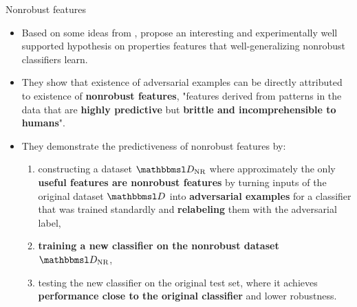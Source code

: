\documentclass{beamer}
\newcommand{\citet}[1]{{\color{citecolor}\relscale{0.8}\textcite{#1}}}
\begin{document}
\begin{frame}[allowframebreaks=0.9]{Nonrobust features}
	\begin{itemize}
		\item Based on some ideas from \citet{Tsipras:2018:RMBOA},  \citet{Ilyas:2019:AENBTF} propose an interesting and experimentally well supported hypothesis on properties features that well-generalizing nonrobust classifiers learn. \item They show that existence of adversarial examples can be directly attributed to existence of \textbf{nonrobust features}, "features derived from patterns in the data that are \textbf{highly predictive} but \textbf{brittle and incomprehensible to humans}".	
		\item They demonstrate the predictiveness of nonrobust features by: 
		\begin{enumerate}
			\item constructing a dataset $\set D_\text{NR}$ where approximately the only \textbf{useful features are nonrobust features} by turning inputs of the original dataset $\set D$ into \textbf{adversarial examples} for a classifier that was trained standardly and \textbf{relabeling} them with the adversarial label,
			\item \textbf{training a new classifier on the nonrobust dataset} $\set D_\text{NR}$,
			\item testing the new classifier on the original test set, where it achieves \textbf{performance close to the original classifier} and lower robustness.
		\end{enumerate}
		

\end{itemize}
\end{frame}
\end{document}
